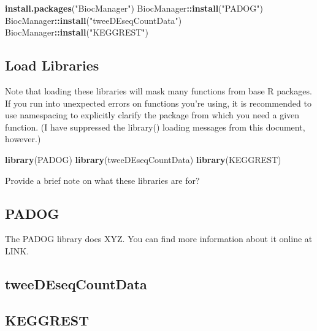\documentclass[
]{book}
\newenvironment{Shaded}{\begin{snugshade}}{\end{snugshade}}
\newcommand{\FunctionTok}[1]{\textcolor[rgb]{0.13,0.29,0.53}{\textbf{#1}}}
\newcommand{\NormalTok}[1]{#1}
\newcommand{\SpecialCharTok}[1]{\textcolor[rgb]{0.81,0.36,0.00}{\textbf{#1}}}
\newcommand{\StringTok}[1]{\textcolor[rgb]{0.31,0.60,0.02}{#1}}
\begin{document}
\begin{Shaded}
\begin{Highlighting}[]
\FunctionTok{install.packages}\NormalTok{(}\StringTok{"BiocManager"}\NormalTok{)}
\NormalTok{BiocManager}\SpecialCharTok{::}\FunctionTok{install}\NormalTok{(}\StringTok{"PADOG"}\NormalTok{)}
\NormalTok{BiocManager}\SpecialCharTok{::}\FunctionTok{install}\NormalTok{(}\StringTok{"tweeDEseqCountData"}\NormalTok{)}
\NormalTok{BiocManager}\SpecialCharTok{::}\FunctionTok{install}\NormalTok{(}\StringTok{"KEGGREST"}\NormalTok{)}
\end{Highlighting}
\end{Shaded}

\hypertarget{load-libraries}{%
\subsection{Load Libraries}\label{load-libraries}}

Note that loading these libraries will mask many functions from base R packages. If you run into unexpected errors on functions you're using, it is recommended to use namespacing to explicitly clarify the package from which you need a given function. (I have suppressed the library() loading messages from this document, however.)

\begin{Shaded}
\begin{Highlighting}[]

\FunctionTok{library}\NormalTok{(PADOG)}
\FunctionTok{library}\NormalTok{(tweeDEseqCountData)}
\FunctionTok{library}\NormalTok{(KEGGREST)}
\end{Highlighting}
\end{Shaded}

Provide a brief note on what these libraries are for?

\hypertarget{padog}{%
\subsection{PADOG}\label{padog}}

The PADOG library does XYZ. You can find more information about it online at LINK.

\hypertarget{tweedeseqcountdata}{%
\subsection{tweeDEseqCountData}\label{tweedeseqcountdata}}

\hypertarget{keggrest}{%
\subsection{KEGGREST}\label{keggrest}}
\end{document}
